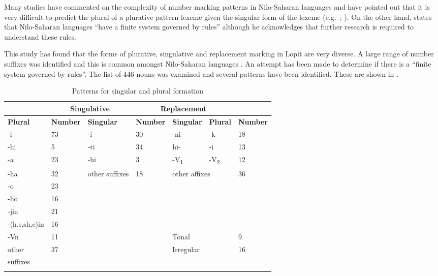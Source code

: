 \documentclass[output=paper]{langsci/langscibook}
\begin{document}
Many studies have commented on the complexity of number marking patterns in Nilo-Saharan languages and have pointed out that it is very difficult to predict the plural of a plurative pattern lexeme given the singular form of the lexeme (e.g.\ \citealt[4]{TuckerMpaayei1955}; \citealt[3]{HildersLawrance1957}). On the other hand, \citet[255]{Dimmendaal2000} states that Nilo-Saharan languages “have a finite system governed by rules” although he acknowledges that further research is required to understand these rules. 

This study has found that the forms of plurative, singulative and replacement marking in Lopit are very diverse. A large range of number suffixes was identified and this is common amongst Nilo-Saharan languages \citep[219]{Dimmendaal2000}. An attempt has been made to determine if there is a “finite system governed by rules”. The list of 446 nouns was examined and several patterns have been identified. These are shown in . 

\begin{table}
\begin{tabularx}{\textwidth}{lXXXXXX}
\lsptoprule

\multicolumn{2}{c}{ \textbf{Plurative}} & \multicolumn{2}{c}{ \textbf{Singulative}} & \multicolumn{3}{c}{ \textbf{Replacement}}\\ \midrule
 \textbf{Plural} & \textbf{Number} & \textbf{Singular} & \textbf{Number} & \textbf{Singular} & \textbf{Plural} & \textbf{Number}\\ \midrule
 {}-i & 73 &  {}-i & 30 &  {}-ni &  {}-k & 18\\
 {}-hi & 5 &  {}-ti & 34 &  hi- &  {}-i & 13\\
 {}-a & 23 &  {}-hi & 3 & {}-{V}{\textsubscript{1}} &  {}-V\textsubscript{2} & 12\\
 {}-ha & 32 & other suffixes & 18 & \multicolumn{2}{l}{other affixes} & 36\\
 {}-o & 23 &  &  &  &  & \\
 {}-ho & 16 &  &  &  &  & \\
 {}-jin & 21 &  &  &  &  & \\
 {}-(h,s,sh,c)in & 16 &  &  &  &  & \\
\hhline{~~~~---}
 {}-Vn & 11 &  &  & Tonal &  & 9\\
other & 37 &  &  & Irregular &  & 16\\
suffixes & & & & & & \\
\lspbottomrule
\end{tabularx}
\caption{Patterns for singular and plural formation}
\label{tab:moodie:9}
\end{table}
\end{document}
